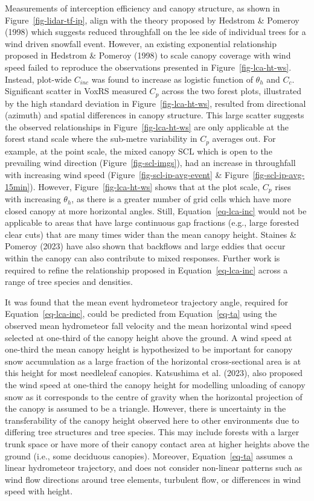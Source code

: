 \documentclass[
  letterpaper,
  DIV=11,
  numbers=noendperiod]{scrartcl}
\begin{document}
Measurements of interception efficiency and canopy structure, as shown
in Figure~\ref{fig-lidar-tf-ip}, align with the theory proposed by
Hedstrom \& Pomeroy (1998) which suggests reduced throughfall on the lee
side of individual trees for a wind driven snowfall event. However, an
existing exponential relationship proposed in Hedstrom \& Pomeroy (1998)
to scale canopy coverage with wind speed failed to reproduce the
observations presented in Figure~\ref{fig-lca-ht-ws}. Instead, plot-wide
\(C_{inc}\) was found to increase as logistic function of \(\theta_h\)
and \(C_c\). Significant scatter in VoxRS measured \(C_p\) across the
two forest plots, illustrated by the high standard deviation in
Figure~\ref{fig-lca-ht-ws}, resulted from directional (azimuth) and
spatial differences in canopy structure. This large scatter suggests the
observed relationships in Figure~\ref{fig-lca-ht-ws} are only applicable
at the forest stand scale where the sub-metre variability in \(C_p\)
averages out. For example, at the point scale, the mixed canopy SCL
which is open to the prevailing wind direction
(Figure~\ref{fig-scl-imgs}), had an increase in throughfall with
increasing wind speed (Figure~\ref{fig-scl-ip-avg-event} \&
Figure~\ref{fig-scl-ip-avg-15min}). However, Figure~\ref{fig-lca-ht-ws}
shows that at the plot scale, \(C_p\) rises with increasing
\(\theta_h\), as there is a greater number of grid cells which have more
closed canopy at more horizontal angles. Still,
Equation~\ref{eq-lca-inc} would not be applicable to areas that have
large continuous gap fractions (e.g., large forested clear cuts) that
are many times wider than the mean canopy height. Staines \& Pomeroy
(2023) have also shown that backflows and large eddies that occur within
the canopy can also contribute to mixed responses. Further work is
required to refine the relationship proposed in
Equation~\ref{eq-lca-inc} across a range of tree species and densities.

It was found that the mean event hydrometeor trajectory angle, required
for Equation~\ref{eq-lca-inc}, could be predicted from
Equation~\ref{eq-ta} using the observed mean hydrometeor fall velocity
and the mean horizontal wind speed selected at one-third of the canopy
height above the ground. A wind speed at one-third the mean canopy
height is hypothesized to be important for canopy snow accumulation as a
large fraction of the horizontal cross-sectional area is at this height
for most needleleaf canopies. Katsushima et al. (2023), also proposed
the wind speed at one-third the canopy height for modelling unloading of
canopy snow as it corresponds to the centre of gravity when the
horizontal projection of the canopy is assumed to be a triangle.
However, there is uncertainty in the transferability of the canopy
height observed here to other environments due to differing tree
structures and tree species. This may include forests with a larger
trunk space or have more of their canopy contact area at higher heights
above the ground (i.e., some deciduous canopies). Moreover,
Equation~\ref{eq-ta} assumes a linear hydrometeor trajectory, and does
not consider non-linear patterns such as wind flow directions around
tree elements, turbulent flow, or differences in wind speed with height.
\end{document}
